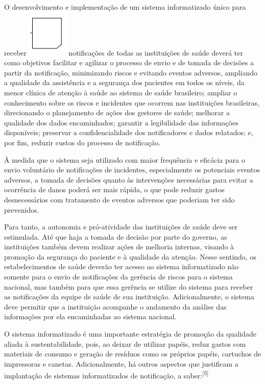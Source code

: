 \documentclass{article}
\begin{document}
O desenvolvimento e implementação de um sistema informatizado único para receber
\includegraphics[height=.8\baselineskip]{0034-8910-rsp-47-04-0791-g1.jpg}
notificações de todas as instituições de saúde deverá ter como objetivos
facilitar e
agilizar o processo de envio e de tomada de decisões a partir da notificação,
minimizando
riscos e evitando eventos adversos, ampliando a qualidade da assistência e a
segurança dos
pacientes em todos os níveis, da menor clínica de atenção à saúde ao sistema de
saúde
brasileiro; ampliar o conhecimento sobre os riscos e incidentes que ocorrem nas
instituições
brasileiras, direcionando o planejamento de ações dos gestores de saúde;
melhorar a
qualidade dos dados encaminhados; garantir a legibilidade das informações
disponíveis;
preservar a confidencialidade dos notificadores e dados relatados; e, por fim,
reduzir
custos do processo de notificação.

À medida que o sistema seja utilizado com maior frequência e eficácia para o
envio
voluntário de notificações de incidentes, especialmente os potenciais eventos
adversos, a
tomada de decisões quanto às intervenções necessárias para evitar a ocorrência
de danos
poderá ser mais rápida, o que pode reduzir gastos desnecessários com tratamento
de eventos
adversos que poderiam ter sido prevenidos.

Para tanto, a autonomia e pró-atividade das instituições de saúde deve ser
estimulada. Até
que haja a tomada de decisão por parte do governo, as instituições também devem
realizar
ações de melhoria internas, visando à promoção da segurança do paciente e à
qualidade da
atenção. Nesse sentindo, os estabelecimentos de saúde deverão ter acesso ao
sistema
informatizado não somente para o envio de notificações da gerência de riscos
para o sistema
nacional, mas também para que essa gerência se utilize do sistema para receber
as
notificações da equipe de saúde de sua instituição. Adicionalmente, o sistema
deve permitir
que a instituição acompanhe o andamento da análise das informações por ela
encaminhadas ao
sistema nacional.

O sistema informatizado é uma importante estratégia de promoção da qualidade
aliada à
sustentabilidade, pois, ao deixar de utilizar papéis, reduz gastos com materiais
de consumo
e geração de resíduos como os próprios papéis, cartuchos de impressoras e
canetas.
Adicionalmente, há outros aspectos que justificam a implantação de sistemas
informatizados
de notificação, a saber:\textsuperscript{[}\textsuperscript{5}\textsuperscript{]}
\end{document}
